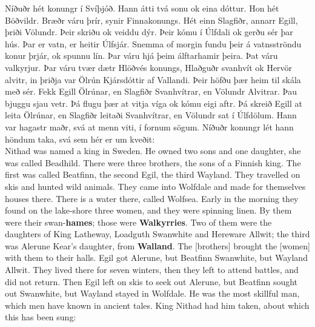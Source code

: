 
\bookStart

\bva Níðuðr hét konungr í Svíþjóð. \bva Hann átti tvá sonu ok eina dóttur. Hon hét Böðvildr. \bva Bræðr váru þrír, synir Finnakonungs. \bva Hét einn Slagfiðr, annarr Egill, þriði Völundr. \bva Þeir skriðu ok veiddu dýr. Þeir kómu í Úlfdali ok gerðu sér þar hús. \bva Þar er vatn, er heitir Úlfsjár. \bva Snemma of morgin fundu þeir á vatnsströndu konur þrjár, ok spunnu lín. \bva Þar váru hjá þeim álftarhamir þeira. Þat váru valkyrjur. \bva Þar váru tvær dætr Hlöðvés konungs, Hlaðguðr svanhvít ok Hervör alvitr, in þriðja var Ölrún Kjársdóttir af Vallandi. \bva Þeir höfðu þær heim til skála með sér. Fekk Egill Ölrúnar, en Slagfiðr Svanhvítrar, en Völundr Alvitrar. \bva Þau bjuggu sjau vetr. Þá flugu þær at vitja víga ok kómu eigi aftr. \bva Þá skreið Egill at leita Ölrúnar, en Slagfiðr leitaði Svanhvítrar, en Völundr sat í Úlfdölum. \bva Hann var hagastr maðr, svá at menn viti, í fornum sögum. \bva Níðuðr konungr lét hann höndum taka, svá sem hér er um kveðit: \\%

\bvb Nithad was named a king in Sweden. \bvb He owned two sons and one daughter, she was called Beadhild. \bvb There were three brothers, the sons of a Finnish king. \bvb The first was called Beatfinn, the second Egil, the third Wayland. \bvb They travelled on skis and hunted wild animals. They came into Wolfdale and made for themselves houses there. \bvb There is a water there, called Wolfsea. \bvb Early in the morning they found on the lake-shore three women, and they were spinning linen. \bvb By them were their swan-\textbf{hames}; those were \textbf{Walkyrries}. \bvb Two of them were the daughters of King Latheway, Loadguth Swanwhite and Hereware Allwit; the third was Alerune Kear's daughter, from \textbf{Walland}. \bvb The [brothers] brought the [women] with them to their halls. Egil got Alerune, but Beatfinn Swanwhite, but Wayland Allwit. \bvb They lived there for seven winters, then they left to attend battles, and did not return. \bvb Then Egil left on skis to seek out Alerune, but Beatfinn sought out Swanwhite, but Wayland stayed in Wolfdale. \bvb He was the most skillful man, which men have known in ancient tales. \bvb King Nithad had him taken, about which this has been sung: \\

\chapterStart

